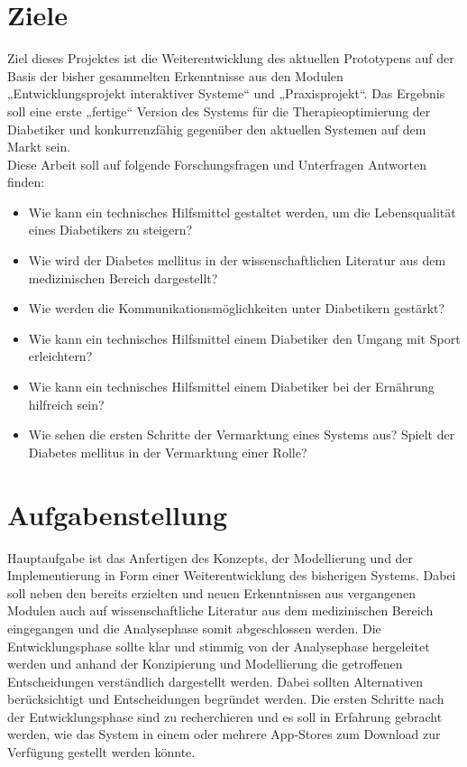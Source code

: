 \documentclass[a4paper, 12pt]{scrartcl}
\begin{document}
			
			
			

			\section{Ziele}
				Ziel dieses Projektes ist die Weiterentwicklung des aktuellen Prototypens auf der Basis der bisher gesammelten Erkenntnisse aus den Modulen „Entwicklungsprojekt interaktiver Systeme“ und „Praxisprojekt“.  Das Ergebnis soll eine erste „fertige“ Version des Systems für die Therapieoptimierung der Diabetiker und konkurrenzfähig gegenüber den aktuellen Systemen auf dem Markt sein. \\
				Diese Arbeit soll auf folgende Forschungsfragen und Unterfragen Antworten finden:

				\begin{itemize}
					 
					\item Wie kann ein technisches Hilfsmittel gestaltet werden, um die Lebensqualität eines Diabetikers zu steigern?
					\item Wie wird der Diabetes mellitus in der wissenschaftlichen Literatur aus dem medizinischen Bereich dargestellt?
					\item Wie werden die Kommunikationsmöglichkeiten unter Diabetikern gestärkt?
					\item Wie kann ein technisches Hilfsmittel einem Diabetiker den Umgang mit Sport erleichtern?
					\item Wie kann ein technisches Hilfsmittel einem Diabetiker bei der Ernährung hilfreich sein?
					\item Wie sehen die ersten Schritte der Vermarktung eines Systems aus? Spielt der Diabetes mellitus in der Vermarktung einer Rolle?

				\end{itemize}
			\newpage
			\section{Aufgabenstellung}
				Hauptaufgabe ist das Anfertigen des Konzepts, der Modellierung und der Implementierung in Form einer Weiterentwicklung des bisherigen Systems. Dabei soll neben den bereits erzielten und neuen Erkenntnissen aus vergangenen Modulen auch auf wissenschaftliche Literatur aus dem medizinischen Bereich eingegangen und die Analysephase somit abgeschlossen werden. Die Entwicklungsphase sollte klar und stimmig von der Analysephase hergeleitet werden und anhand der Konzipierung und Modellierung die getroffenen Entscheidungen verständlich dargestellt werden. Dabei sollten Alternativen berücksichtigt und Entscheidungen begründet werden. Die ersten Schritte nach der Entwicklungsphase sind zu recherchieren und es soll in Erfahrung gebracht werden, wie das System in einem oder mehrere App-Stores zum Download zur Verfügung gestellt werden könnte.
			
\end{document}
